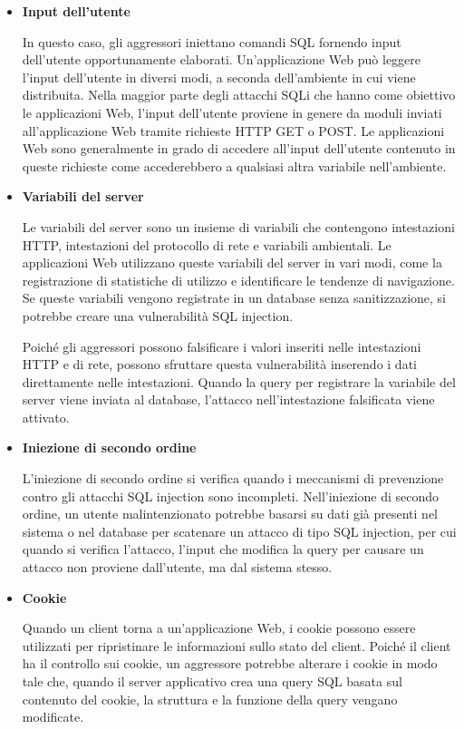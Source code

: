 \begin{itemize}
    \item \textbf{Input dell'utente}
    
    In questo caso, gli aggressori iniettano comandi SQL fornendo input dell'utente opportunamente elaborati. Un'applicazione Web può leggere l'input dell'utente in diversi modi, a seconda dell'ambiente in cui viene distribuita. Nella maggior parte degli attacchi SQLi che hanno come obiettivo le applicazioni Web, l'input dell'utente proviene in genere da moduli inviati all'applicazione Web tramite richieste HTTP GET o POST. Le applicazioni Web sono generalmente in grado di accedere all'input dell'utente contenuto in queste richieste come accederebbero a qualsiasi altra variabile nell'ambiente. 
    
    \item \textbf{Variabili del server} 
    
    Le variabili del server sono un insieme di variabili che contengono intestazioni HTTP, intestazioni del protocollo di rete e variabili ambientali. Le applicazioni Web utilizzano queste variabili del server in vari modi, come la registrazione di statistiche di utilizzo e identificare le tendenze di navigazione. Se queste variabili vengono registrate in un database senza sanitizzazione, si potrebbe creare una vulnerabilità SQL injection.
    
    Poiché gli aggressori possono falsificare i valori inseriti nelle intestazioni HTTP e di rete, possono sfruttare questa vulnerabilità inserendo i dati direttamente nelle intestazioni. Quando la query per registrare la variabile del server viene inviata al database, l'attacco nell'intestazione falsificata viene attivato.
    
    \item \textbf{Iniezione di secondo ordine}
    
    L'iniezione di secondo ordine si verifica quando i meccanismi di prevenzione contro gli attacchi SQL injection sono incompleti. Nell'iniezione di secondo ordine, un utente malintenzionato potrebbe basarsi su dati già presenti nel sistema o nel database per scatenare un attacco di tipo SQL injection, per cui quando si verifica l'attacco, l'input che modifica la query per causare un attacco non proviene dall'utente, ma dal sistema stesso.
    
    \item \textbf{Cookie}
    
    Quando un client torna a un'applicazione Web, i cookie possono essere utilizzati per ripristinare le informazioni sullo stato del client. Poiché il client ha il controllo sui cookie, un aggressore potrebbe alterare i cookie in modo tale che, quando il server applicativo crea una query SQL basata sul contenuto del cookie, la struttura e la funzione della query vengano modificate.
    

\end{itemize}
